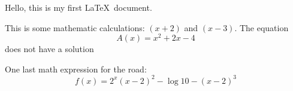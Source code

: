 \documentclass[12pt]{article}
\begin{document}
Hello, this is my first \LaTeX\ document. 

This is some mathematic calculations: $(x + 2)$ and $(x - 3)$.
The equation \[{A(x)=x^2+2x-4}\] does not have a solution

One last math expression for the road: \[f(x) = 2^x {(x - 2)}^2 - \log10 - {(x -2)}^3\]
\end{document}
